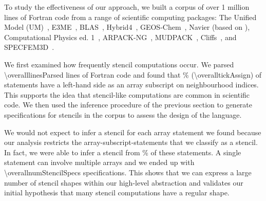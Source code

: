 

To study the effectiveness of our approach, 
we built a corpus of over 1 million lines of Fortran code from a
range of scientific computing packages: The Unified Model (UM)~\cite{um},
E3ME~\cite{RePEc:aen:journl:2006se-a12}, BLAS~\cite{blas},
Hybrid4~\cite{GBC:GBC635}, GEOS-Chem~\cite{geos-chem}, Navier (based
on \cite{griebel1997numerical}), Computational Physics
ed. 1~\cite{giordano1997computational},
ARPACK-NG~\cite{arpackng}, MUDPACK~\cite{MUD}, Cliffs~\cite{Cliffs}, and
SPECFEM3D~\cite{specfem3d}.

We first examined how frequently stencil computations occur. We parsed
\num{\overalllinesParsed} lines of Fortran code and found that \overalltickAssignPercent\%
(\num{\overalltickAssign}) of statements have a left-hand side as an
array subscript on neighbourhood indices. This supports the idea that
stencil-like computations are common in scientific code.  We then used
the inference procedure of the previous section to generate
specifications for stencils in the corpus to assess the design of the
language.

We would not expect to infer a stencil for each array statement we
found because our analysis restricts the array-subscript-statements
that we classify as a stencil. In fact, we were able to infer a
stencil from \overalltickAssignSuccessPercentOfTickAssign\% of these
statements. A single statement can involve multiple arrays and we
ended up with \num{\overallnumStencilSpecs} specifications. This shows
that we can express a large number of stencil shapes within our
high-level abstraction and validates our initial hypothesis that many
stencil computations have a regular shape.

